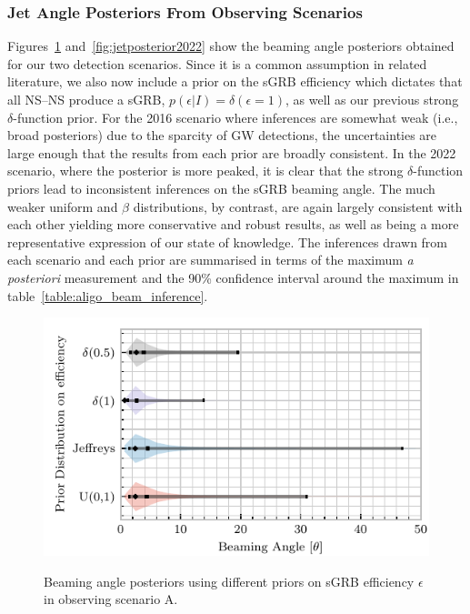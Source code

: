 \documentclass[twocolumn,nofootinbib]{revtex4-1}
\newcommand{\BNS}{\ac{NS}--\ac{NS}\xspace}
\begin{document}
\subsubsection{Jet Angle Posteriors From Observing Scenarios}
Figures~\ref{fig:jetposterior2016} and~\ref{fig:jetposterior2022} show the beaming angle posteriors obtained for our two detection scenarios.
Since it is a common assumption in related literature, we also now include a prior on the \ac{sGRB} efficiency which dictates that all \BNS produce a \ac{sGRB}, $p(\epsilon|I)=\delta(\epsilon=1)$, as well as our previous strong $\delta$-function prior.
For the 2016 scenario where inferences are somewhat weak (i.e., broad posteriors) due to the sparcity of \ac{GW} detections, the uncertainties are large enough that the results from each prior are broadly consistent.
In the 2022 scenario, where the posterior is more peaked, it is clear that the strong $\delta$-function priors lead to inconsistent inferences on the \ac{sGRB} beaming angle.
The much weaker uniform and $\beta$ distributions, by contrast, are again largely consistent with each other yielding more conservative and robust results, as well as being a more representative expression of our state of knowledge.
The inferences drawn from each scenario and each prior are summarised in terms of the maximum \emph{a posteriori} measurement and the 90\% confidence interval around the maximum in table~\ref{table:aligo_beam_inference}.

\begin{figure}
\centering
{\includegraphics[width=\linewidth]{O1_beaming_posteriors_violin.pdf}}
\caption{Beaming angle posteriors using different priors on \ac{sGRB} efficiency $\epsilon$ in observing scenario A.
    \label{fig:jetposterior2016}}
\end{figure}
\end{document}
